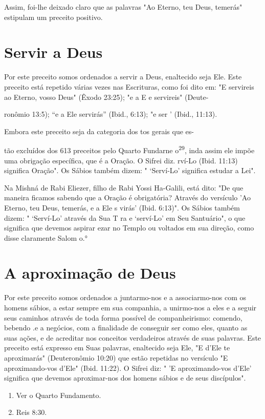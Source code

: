 Assim, foi-lhe deixado claro que as palavras "Ao Eterno, teu Deus,
temerás" estipulam um preceito positivo.


\section{Servir a Deus}

Por este preceito somos ordenados a servir a Deus, enaltecido seja Ele.
Este preceito está repetido várias vezes nas Escrituras, como foi dito
em: "E servireis ao Eterno, vosso Deus" (Êxodo 23:25); "e a E e
servireis" (Deute-

ronômio 13:5); ``e a Ele servirás'' (Ibid., 6:13); "e ser ' (Ibid.,
11:13).

Embora este preceito seja da categoria dos tos gerais que es-

tão excluídos dos 613 preceitos pelo Quarto Fundarne
o\textsuperscript{29}, inda assim ele im­põe uma obrigação específica,
que é a Oração. O Sifrei diz. rví-Lo (Ibid. 11:13) significa Oração". Os
Sábios também dizem: " `Serví-Lo' significa estudar a Lei".

Na Mishná de Rabi Eliezer, filho de Rabi Yossi Ha-Galili, está dito: "De
que maneira ficamos sabendo que a Oração é obrigatória? Através do
ver­sículo 'Ao Eterno, teu Deus, temerás, e a Ele s virás' (Ibid.
6:13)". Os Sábios também dizem: " `Serví-Lo' através da Sua T ra e
`serví-Lo' em Seu Santuá­rio", o que significa que devemos aspirar ezar
no Templo ou voltados em sua direção, como disse claramente Salom
o.°

\section{A aproximação de Deus}

Por este preceito somos ordenados a juntarmo-nos e a associarmo-nos com
os homens sábios, a estar sempre em sua companhia, a unirmo-nos a eles e
a seguir seus caminhos através de toda forma possível de
companheiris­mo: comendo, bebendo .e a negócios, com a finalidade de
conseguir ser como eles, quanto as suas ações, e de acreditar nos
conceitos verdadeiros através de suas palavras. Este preceito está
expresso em Suas palavras, enaltecido seja Ele, "E d'Ele te aproximarás"
(Deuteronômio 10:20) que estão repetidas no versí­culo "E
aproximando-vos d'Ele" (Ibid. 11:22). O Sifrei diz: " 'E aproximando-vos
d'Ele' significa que devemos aproximar-nos dos homens sábios e de seus
discípulos".


\begin{enumerate}
\def\labelenumi{\arabic{enumi}.}
\setcounter{enumi}{28}
\item
 
 Ver o Quarto Fundamento.
 
\item
 
 Reis 8:30.
 
\end{enumerate}


